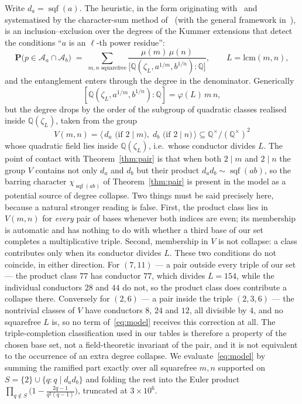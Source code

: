\documentclass[11pt,reqno]{amsart}
\theoremstyle{plain}
\theoremstyle{definition}
\DeclareMathOperator{\sqf}{sqf}
\newcommand{\Acal}{\mathcal{A}}
\newcommand{\Q}{\mathbb{Q}}
\begin{document}
Write $d_a = \sqf(a)$. The heuristic, in the form originating
with~\cite{Matthews1976} and systematised by the character-sum method
of~\cite{MoreeStevenhagen2014} (with the general framework
in~\cite{JarviniemiPeruccaSgobba2025}), is an inclusion--exclusion over the
degrees of the Kummer extensions that detect the conditions ``$a$ is an
$\ell$-th power residue'':
\begin{equation}
\label{eq:model}
  \mathbf{P}\bigl(p \in \Acal_a \cap \Acal_b\bigr)
  \;=\; \sum_{m, n \text{ squarefree}}
  \frac{\mu(m)\,\mu(n)}
       {\bigl[\Q(\zeta_L, a^{1/m}, b^{1/n}) : \Q\bigr]},
  \qquad L = \mathrm{lcm}(m,n),
\end{equation}
and the entanglement enters through the degree in the denominator. Generically
\[
  [\Q(\zeta_L, a^{1/m}, b^{1/n}):\Q] = \varphi(L)\,m\,n ,
\]
but the degree drops by the order of the subgroup of quadratic classes
realised inside $\Q(\zeta_L)$, taken from the group
\[
  V(m,n) = \bigl\langle\, d_a \text{ (if $2 \mid m$)},\;
                          d_b \text{ (if $2 \mid n$)} \,\bigr\rangle
  \subseteq \Q^\times/(\Q^\times)^2
\]
whose quadratic field lies inside $\Q(\zeta_L)$, i.e.\ whose conductor divides
$L$. The point of contact with Theorem~\ref{thm:pair} is that when both
$2 \mid m$ and $2 \mid n$ the group $V$ contains not only $d_a$ and $d_b$ but
their product $d_a d_b \sim \sqf(ab)$, so the barring character
$\chi_{\sqf(ab)}$ of Theorem~\ref{thm:pair} is present in the model as a
potential source of degree collapse. Two things must be said precisely here,
because a natural stronger reading is false. First, the product class lies in
$V(m,n)$ for \emph{every} pair of bases whenever both indices are even; its
membership is automatic and has nothing to do with whether a third base of our
set completes a multiplicative triple. Second, membership in $V$ is not
collapse: a class contributes only when its conductor divides $L$. These two
conditions do not coincide, in either direction. For $(7,11)$ --- a pair
outside every triple of our set --- the product class $77$ has conductor $77$,
which divides $L = 154$, while the individual conductors $28$ and $44$ do not,
so the product class does contribute a collapse there. Conversely for $(2,6)$
--- a pair inside the triple $(2,3,6)$ --- the nontrivial classes of $V$ have
conductors $8$, $24$ and $12$, all divisible by $4$, and no squarefree $L$ is,
so no term of~\eqref{eq:model} receives this correction at all. The
triple-completion classification used in our tables is therefore a property of
the chosen base set, not a field-theoretic invariant of the pair, and it is not
equivalent to the occurrence of an extra degree collapse. We evaluate~\eqref{eq:model}
by summing the ramified part exactly over all squarefree $m, n$ supported on
$S = \{2\} \cup \{q : q \mid d_a d_b\}$ and folding the rest into the Euler
product $\prod_{q \notin S}\bigl(1 - \tfrac{2q-1}{q^2(q-1)}\bigr)$,
truncated at $3 \times 10^6$.
\end{document}
